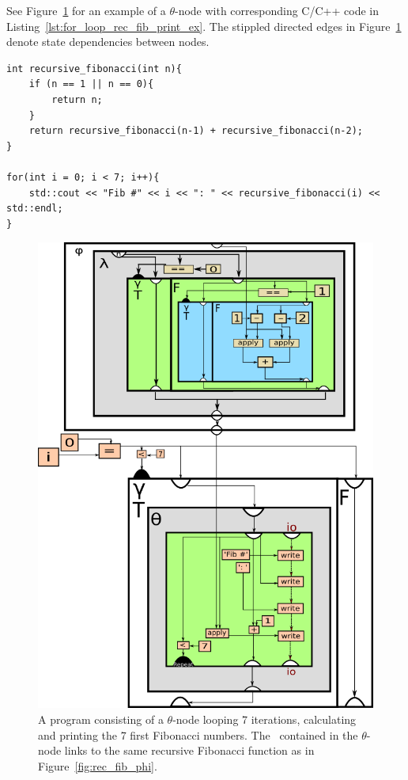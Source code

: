 \begin{itemize}
See Figure~\ref{fig:for_loop_rec_fib_print_ex} for an example of a $\theta$-node
with corresponding C/C++ code in Listing~\ref{lst:for_loop_rec_fib_print_ex}.
The stippled directed edges in Figure~\ref{fig:for_loop_rec_fib_print_ex} denote
state dependencies between nodes.

\begin{lstlisting}[label={lst:for_loop_rec_fib_print_ex}, style=customcpp,
caption={C/C++ code corresponding to the RVSDG subgraph in
Figure~\ref{fig:for_loop_rec_fib_print_ex}.}]
int recursive_fibonacci(int n){
	if (n == 1 || n == 0){
		return n;
	}
	return recursive_fibonacci(n-1) + recursive_fibonacci(n-2);
}

for(int i = 0; i < 7; i++){
	std::cout << "Fib #" << i << ": " << recursive_fibonacci(i) << std::endl;
}
\end{lstlisting}
\vspace{-4\parskip} %
\newpage

\begin{figure}[ht!]
	\centering
	\includegraphics[width=\textwidth]{figures/for-loop-printf-rec_fib-example}
	\caption{A program consisting of a $\theta$-node looping 7 iterations,
calculating and printing the 7 first Fibonacci numbers. The \applyNode ~contained
in the $\theta$-node links to the same recursive Fibonacci function as in
Figure~\ref{fig:rec_fib_phi}.}
	\label{fig:for_loop_rec_fib_print_ex}
\end{figure}


\end{itemize}
